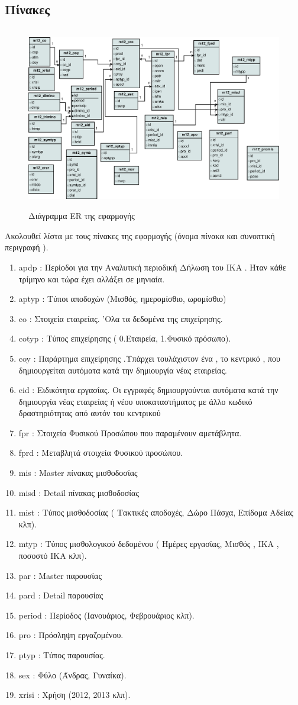 \documentclass[A4,10pt,greek]{book}
\begin{document}
\subsection{Πίνακες}
\begin{figure}[!htb]
\includegraphics[width=150mm,height=80mm]{m13.eps}
\caption{Διάγραμμα ER της εφαρμογής}
\label{fig:diagrEr}
\end{figure}
Ακολουθεί λίστα με τους πίνακες της εφαρμογής (όνομα πίνακα και συνοπτική περιγραφή ).
\begin{enumerate}
\item apdp : Περίοδοι για την Αναλυτική περιοδική Δήλωση του ΙΚΑ . Ήταν κάθε τρίμηνο και τώρα έχει αλλάξει σε μηνιαία.
\item aptyp : Τύποι αποδοχών (Μισθός, ημερομίσθιο, ωρομίσθιο)
\item co : Στοιχεία εταιρείας. 'Ολα τα δεδομένα της επιχείρησης.
\item cotyp : Τύπος επιχείρησης ( 0.Εταιρεία, 1.Φυσικό πρόσωπο).
\item coy : Παράρτημα επιχείρησης .Υπάρχει τουλάχιστον ένα , το κεντρικό , που δημιουργείται αυτόματα κατά την δημιουργία νέας εταιρείας.
\item eid : Ειδικότητα εργασίας. Οι εγγραφές δημιουργούνται αυτόματα κατά την δημιουργία νέας εταιρείας ή νέου υποκαταστήματος με άλλο κωδικό δραστηριότητας από αυτόν του κεντρικού
\item fpr   : Στοιχεία Φυσικού Προσώπου  που παραμένουν αμετάβλητα.
\item fprd : Μεταβλητά στοιχεία Φυσικού προσώπου.
\item mis : Master πίνακας μισθοδοσίας
\item misd : Detail πίνακας μισθοδοσίας
\item mist : Tύπος μισθοδοσίας ( Τακτικές αποδοχές, Δώρο Πάσχα, Επίδομα Αδείας κλπ).
\item mtyp : Τύπος μισθολογικού δεδομένου ( Ημέρες εργασίας, Μισθός , ΙΚΑ , ποσοστό ΙΚΑ κλπ).
\item par : Master παρουσίας
\item pard : Detail παρουσίας
\item period : Περίοδος (Ιανουάριος, Φεβρουάριος κλπ).
\item pro : Πρόσληψη εργαζομένου.
\item ptyp : Τύπος παρουσίας.
\item sex : Φύλο (Άνδρας, Γυναίκα).
\item xrisi : Χρήση (2012, 2013 κλπ). 
\end{enumerate}
\end{document}
